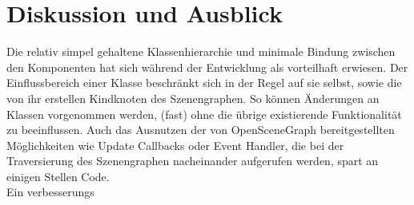 \documentclass{llncs}
\begin{document}
\section{Diskussion und Ausblick}
Die relativ simpel gehaltene Klassenhierarchie und minimale Bindung zwischen den Komponenten hat sich w\"ahrend der Entwicklung als
vorteilhaft erwiesen. Der Einflussbereich einer Klasse beschr\"ankt sich in der Regel auf sie selbst, sowie die von ihr erstellen
Kindknoten des Szenengraphen. So k\"onnen \"Anderungen an Klassen vorgenommen werden, (fast) ohne die \"ubrige existierende Funktionalit\"at
zu beeinflussen. Auch das Ausnutzen der von OpenSceneGraph bereitgestellten M\"oglichkeiten wie Update Callbacks oder Event Handler, die
bei der Traversierung des Szenengraphen nacheinander aufgerufen werden, spart an einigen Stellen Code.\\
Ein verbesserungs
\end{document}
